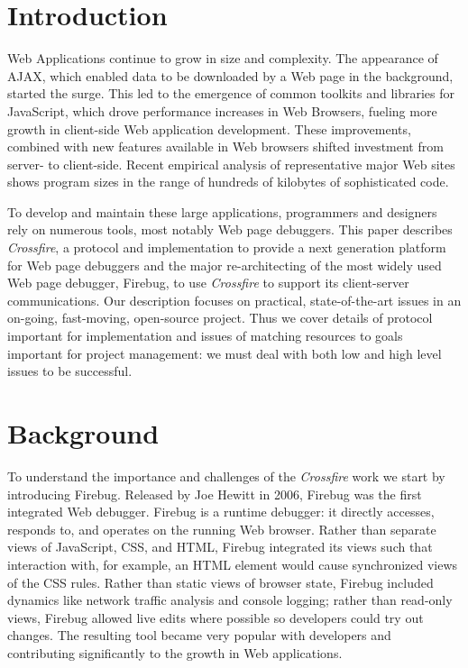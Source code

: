 
\section{Introduction}
Web Applications continue to grow in size and complexity. The
appearance of AJAX, which enabled data to be downloaded by a Web page
in the background, started the surge. This led to the emergence of common
toolkits and libraries for JavaScript, which drove  performance increases in Web Browsers, fueling more growth in client-side Web application development.
These improvements, combined with new features available in Web browsers shifted
investment from server- to client-side. Recent empirical analysis of
representative
 major Web sites shows program sizes in the range of hundreds of kilobytes of
sophisticated code.\cite{VitekDynamicJS2010}

To develop and maintain these large applications, programmers and designers rely
on numerous tools, most notably Web page debuggers. This paper describes
\textit{Crossfire}, a protocol and implementation to provide a next generation
platform for Web page debuggers and the major re-architecting of the most widely used Web
page debugger, Firebug, to use \textit{Crossfire} to support its client-server
communications. Our description focuses on practical, state-of-the-art issues in
an on-going, fast-moving, open-source project. Thus we cover details of protocol
important for implementation and issues of matching resources to goals important
for project management: we must deal with both low and high level issues to
be successful.

\section{Background}
To understand the importance and challenges of the \textit{Crossfire} work we
start by introducing Firebug. Released by Joe Hewitt in 2006, Firebug was the
first integrated Web debugger. Firebug is a runtime debugger: it directly
accesses, responds to, and operates on the running Web browser.  Rather than
separate views of JavaScript, CSS, and HTML, Firebug integrated its views such
that interaction with, for example, an HTML element would cause synchronized
views of the CSS rules. Rather than static
 views of browser state, Firebug included dynamics like network traffic analysis
 and console logging; rather
than read-only views, Firebug allowed live edits where possible so developers
could try out changes. The resulting tool became very popular with developers
and contributing significantly to the growth in Web applications.

